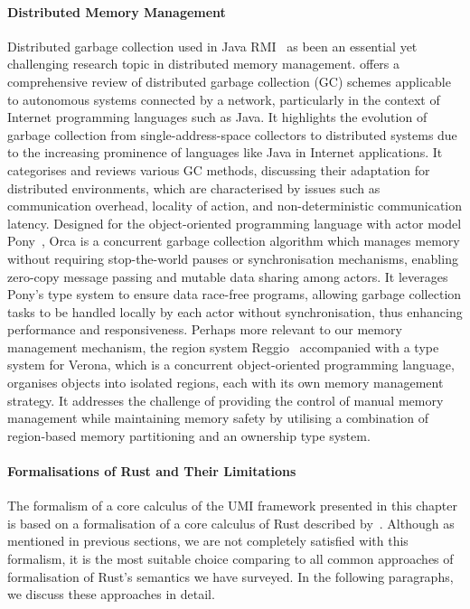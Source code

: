 \paragraph*{Distributed Memory Management}
Distributed garbage collection used in Java RMI~\citep{10.5555/1268049.1268066} as been an essential yet challenging research topic in distributed memory management. \citet{10.1145/292469.292471} offers a comprehensive review of distributed garbage collection (GC) schemes applicable to autonomous systems connected by a network, particularly in the context of Internet programming languages such as Java. It highlights the evolution of garbage collection from single-address-space collectors to distributed systems due to the increasing prominence of languages like Java in Internet applications. It categorises and reviews various GC methods, discussing their adaptation for distributed environments, which are characterised by issues such as communication overhead, locality of action, and non-deterministic communication latency. Designed for the object-oriented programming language with actor model Pony~\citep{10.1145/3133896}, Orca is a concurrent garbage collection algorithm which manages memory without requiring stop-the-world pauses or synchronisation mechanisms, enabling zero-copy message passing and mutable data sharing among actors. It leverages Pony's type system to ensure data race-free programs, allowing garbage collection tasks to be handled locally by each actor without synchronisation, thus enhancing performance and responsiveness.
Perhaps more relevant to our memory management mechanism, the region system Reggio~\citep{10.1145/3622846} accompanied with a type system for Verona, which is a concurrent object-oriented programming language, organises objects into isolated regions, each with its own memory management strategy. It addresses the challenge of providing the control of manual memory management while maintaining memory safety by utilising a combination of region-based memory partitioning and an ownership type system.

\paragraph*{Formalisations of Rust and Their Limitations}
The formalism of a core calculus of the UMI framework presented in this chapter is based on a formalisation of a core calculus of Rust described by~\citet{10.1145/3443420}. Although as mentioned in previous sections, we are not completely satisfied with this formalism, it is the most suitable choice comparing to all common approaches of formalisation of Rust's semantics we have surveyed. In the following paragraphs, we discuss these approaches in detail.

